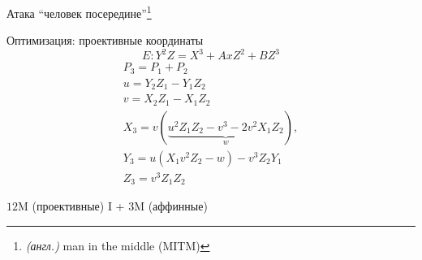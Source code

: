 \documentclass{beamer}
\begin{document}
	\begin{frame}{Атака ``человек посередине''\footnote{\textit{(англ.)} man in the middle (MITM)}}
		\begin{center}
			
		\end{center}

	\end{frame}

	
	
	
	\begin{frame}{Оптимизация: проективные координаты}
		\[E: Y^2 Z = X^3+ A x Z^2 + B Z^3\]
		\begin{gather*}
			P_3 = P_1 + P_2 \\
			u = Y_2 Z_1 - Y_1 Z_2\\
			v = X_2 Z_1 - X_1 Z_2 \\
			X_3 = v(\underbrace{u^2 Z_1 Z_2 - v^3 - 2 v^2 X_1 Z_2}_w), \\
			Y_3 = u(X_1 v^2 Z_2 - w) - v^3 Z_2 Y_1 \\
			Z_3 = v^3 Z_1 Z_2
		\end{gather*}
		\begin{center}
			\begin{tcolorbox}[enhanced,hbox,colback=box-blue-color!15,colframe=box-blue-color,title=Сложность,center title]
				\begin{varwidth}{\textwidth}
					$12$M (проективные)  I + $3$M (аффинные)
				\end{varwidth}
			\end{tcolorbox}	
		\end{center}
	\end{frame}
	
\end{document}
